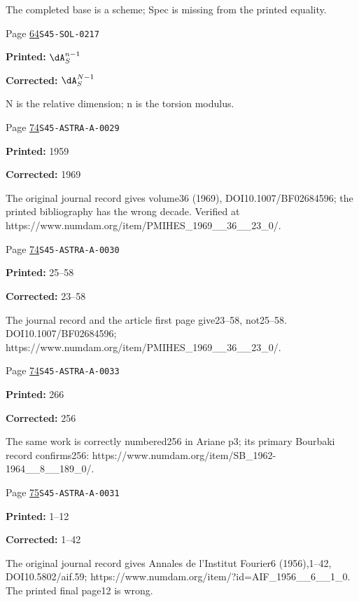 \begin{description}
\par\noindent The completed base is a scheme; Spec is missing from the printed equality.
\smallskip
\item[\hypertarget{apparatus:EN-0022}{22}] Page \hyperlink{printpage:en:64}{64}\quad\texttt{S45-SOL-0217}
\par\noindent\textbf{Printed:} \(\dA_S^{n-1}\)
\par\noindent\textbf{Corrected:} \(\dA_S^{N-1}\)
\par\noindent N is the relative dimension; n is the torsion modulus.
\smallskip
\item[\hypertarget{apparatus:EN-0023}{23}] Page \hyperlink{printpage:en:74}{74}\quad\texttt{S45-ASTRA-A-0029}
\par\noindent\textbf{Printed:} 1959
\par\noindent\textbf{Corrected:} 1969
\par\noindent The original journal record gives volume36 (1969), DOI10.1007/BF02684596; the printed bibliography has the wrong decade. Verified at https://www.numdam.org/item/PMIHES\_1969\_\_36\_\_23\_0/.
\smallskip
\item[\hypertarget{apparatus:EN-0024}{24}] Page \hyperlink{printpage:en:74}{74}\quad\texttt{S45-ASTRA-A-0030}
\par\noindent\textbf{Printed:} 25--58
\par\noindent\textbf{Corrected:} 23--58
\par\noindent The journal record and the article first page give23–58, not25–58. DOI10.1007/BF02684596; https://www.numdam.org/item/PMIHES\_1969\_\_36\_\_23\_0/.
\smallskip
\item[\hypertarget{apparatus:EN-0025}{25}] Page \hyperlink{printpage:en:74}{74}\quad\texttt{S45-ASTRA-A-0033}
\par\noindent\textbf{Printed:} 266
\par\noindent\textbf{Corrected:} 256
\par\noindent The same work is correctly numbered256 in Ariane p3; its primary Bourbaki record confirms256: https://www.numdam.org/item/SB\_1962-1964\_\_8\_\_189\_0/.
\smallskip
\item[\hypertarget{apparatus:EN-0026}{26}] Page \hyperlink{printpage:en:75}{75}\quad\texttt{S45-ASTRA-A-0031}
\par\noindent\textbf{Printed:} 1--12
\par\noindent\textbf{Corrected:} 1--42
\par\noindent The original journal record gives Annales de l’Institut Fourier6 (1956),1–42, DOI10.5802/aif.59; https://www.numdam.org/item/?id=AIF\_1956\_\_6\_\_1\_0. The printed final page12 is wrong.

\end{description}
